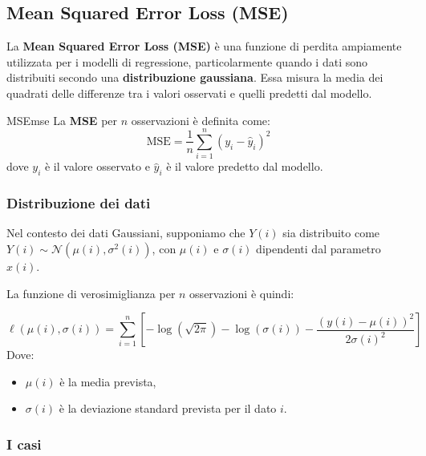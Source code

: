 \subsection{Mean Squared Error Loss (MSE)}\label{subsec:mse}

La \textbf{Mean Squared Error Loss (MSE)} è una funzione di perdita ampiamente utilizzata per i modelli di regressione, particolarmente quando i dati sono distribuiti secondo una \textbf{distribuzione gaussiana}. Essa misura la media dei quadrati delle differenze tra i valori osservati e quelli predetti dal modello.

\begin{definizione}{MSE}{mse}
La \textbf{MSE} per \( n \) osservazioni è definita come:
\[
\mathrm{MSE} = \frac{1}{n} \sum_{i=1}^n \left( y_i - \hat{y}_i \right)^2
\]
dove \( y_i \) è il valore osservato e \( \hat{y}_i \) è il valore predetto dal modello.
\end{definizione}

\subsubsection*{Distribuzione dei dati}

Nel contesto dei dati Gaussiani, supponiamo che \( Y(i) \) sia distribuito come \( Y(i) \sim \mathcal{N}(\mu(i), \sigma^2(i)) \), con \( \mu(i) \) e \( \sigma(i) \) dipendenti dal parametro \( x(i) \).

La funzione di verosimiglianza per \( n \) osservazioni è quindi:

\[
\ell(\mu(i), \sigma(i)) = \sum_{i=1}^n \left[-\log(\sqrt{2\pi}) -\log(\sigma(i)) - \frac{(y(i) - \mu(i))^2}{2\sigma(i)^2} \right]
\]
Dove:
\begin{itemize}
    \item \( \mu(i) \) è la media prevista,
    \item \( \sigma(i) \) è la deviazione standard prevista per il dato \( i \).
\end{itemize}

\subsubsection{I casi}


